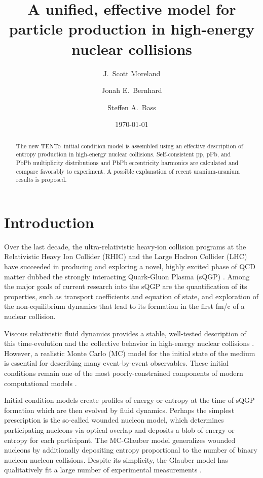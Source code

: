 \documentclass[aps,prl,reprint,amsmath,nofootinbib]{revtex4-1}
\newcommand{\trento}{T\raisebox{-.5ex}{R}ENTo}
\begin{document}
\title{A unified, effective model for particle production in high-energy nuclear collisions}

\author{J.\ Scott Moreland}
\author{Jonah E.\ Bernhard}
\author{Steffen A.\ Bass}

\date{\today}


\begin{abstract}
  The new \trento\ initial condition model is assembled using an effective description of entropy production
  in high-energy nuclear collisions.  Self-consistent pp, pPb, and PbPb multiplicity distributions and PbPb
  eccentricity harmonics are calculated and compare favorably to experiment.  A possible explanation of recent
  uranium-uranium results is proposed.
\end{abstract}


\maketitle

\section{Introduction}

Over the last decade, the ultra-relativistic heavy-ion collision programs at the Relativistic Heavy Ion Collider (RHIC) and the Large Hadron Collider 
(LHC) have succeeded in producing and exploring a novel, highly excited phase of QCD matter dubbed the strongly interacting Quark-Gluon Plasma (sQGP) 
\cite{Arsene:2004fa,Adcox:2004mh,Back:2004je,Adams:2005dq,Gyulassy:2004zy,Muller:2006ee,Muller:2012zq}. Among the major goals of current research into 
the sQGP are the quantification of its properties, such as transport coefficients and equation of state, and exploration of the non-equilibrium dynamics 
that lead to its formation in the first fm/c of a nuclear collision. 

Viscous relativistic fluid dynamics provides 
a stable, well-tested description of this time-evolution and the collective behavior in high-energy nuclear collisions \cite{}.  However, a 
realistic Monte Carlo (MC) model for the initial state of the medium is essential for describing many event-by-event observables.  These initial 
conditions remain one of the most poorly-constrained components of modern computational models \cite{}.

Initial condition models create profiles of energy or entropy at the time of sQGP formation which are then evolved by
fluid dynamics.  Perhaps the simplest prescription is the so-called wounded nucleon model, which determines
participating nucleons via optical overlap and deposits a blob of energy or entropy for each participant.  The
MC-Glauber model generalizes wounded nucleons by additionally depositing entropy proportional to the number of
binary nucleon-nucleon collisions.  Despite its simplicity, the Glauber model has qualitatively fit a large number 
of experimental measurements \cite{}.
\end{document}
